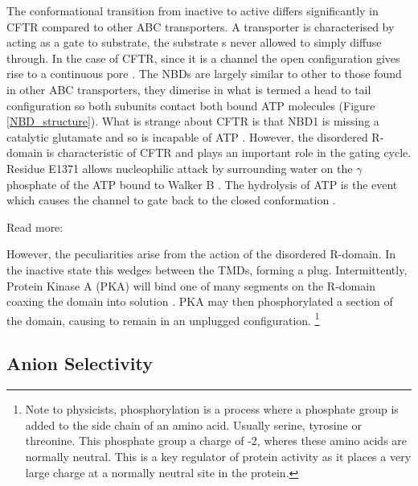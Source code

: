The conformational transition from inactive to active differs significantly in CFTR compared to other ABC transporters. A transporter is characterised by acting as a gate to substrate, the substrate s never allowed to simply diffuse through. In the case of CFTR, since it is a channel the open configuration gives rise to a continuous pore \cite{linsdell2018}. The NBDs are largely similar to other to those found in other ABC transporters, they dimerise in what is termed a head to tail configuration so both subunits contact both bound ATP molecules \cite{} (Figure \ref{NBD_structure}). What is strange about CFTR is that NBD1 is missing a catalytic glutamate and so is incapable of ATP . However, the disordered R-domain is characteristic of CFTR and plays an important role in the gating cycle. Residue E1371 allows nucleophilic attack by surrounding water on the $\gamma$ phosphate  of the ATP bound to Walker B \cite{stratford2007}. The hydrolysis of ATP is the event which causes the channel to gate back to the closed conformation \cite{}. 

Read more: \cite{ramjeesingh1999}

However, the peculiarities arise from the action of the disordered R-domain. In the inactive state this wedges between the TMDs, forming a plug. Intermittently, Protein Kinase A (PKA) will bind one of many segments on the R-domain coaxing the domain into solution \cite{mihalyi2020}. PKA may then phosphorylated a section of the domain, causing to remain in an unplugged configuration. \footnote{Note to physicists, phosphorylation is a process where a phosphate group is added to the side chain of an amino acid. Usually serine, tyrosine or threonine. This phosphate group a charge of -2, wheres these amino acids are normally neutral. This is a key regulator of protein activity as it places a very large charge at a normally neutral site in the protein.}

\subsection {Anion Selectivity}

